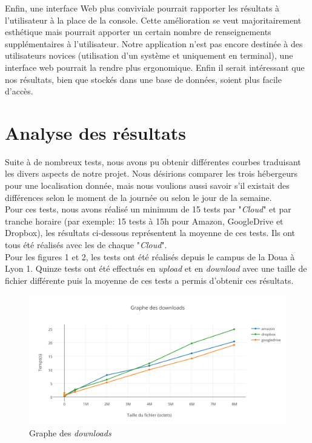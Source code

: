 \documentclass[10pt]{article}
\begin{document}
Enfin, une interface Web plus conviviale
pourrait rapporter les résultats à l'utilisateur à la place de la
console. Cette amélioration se veut majoritairement esthétique mais
pourrait apporter un certain nombre de renseignements supplémentaires
à l'utilisateur. Notre application n'est pas encore destinée à des utilisateurs novices (utilisation d'un système \Unix et uniquement en terminal), une interface web pourrait la rendre plus ergonomique. Enfin il serait intéressant que nos résultats, bien que stockés dans une base de données, soient plus facile d'accès.

\section{Analyse des résultats}

Suite à de nombreux tests, nous avons pu obtenir différentes courbes traduisant
les divers aspects de notre projet. Nous désirions comparer les trois hébergeurs
pour une localisation donnée, mais nous voulions aussi savoir s'il existait des
différences selon le moment de la journée ou selon le jour de la semaine.\\

Pour ces tests, nous avons réalisé un minimum de 15 tests par "\textit{Cloud}" et par tranche horaire (par exemple: 15 tests à 15h pour Amazon, GoogleDrive et Dropbox), les résultats ci-dessous représentent la moyenne de ces tests. Ils ont tous été réalisés avec les \SDK de chaque "\textit{Cloud}".\\

Pour les figures 1 et 2, les tests ont été réalisés depuis le campus de la Doua
à Lyon 1. Quinze tests ont été effectués en \textit{upload} et en
\textit{download} avec une taille de fichier différente puis la moyenne de ces
tests a permis d'obtenir ces résultats.

\begin{figure}[h] \centering
\includegraphics[scale=0.7]{graphe_des_downloads.png} \caption{Graphe des
\textit{downloads}} \end{figure}
\end{document}
